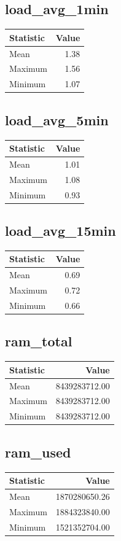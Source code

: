 \documentclass[11pt]{article}
\begin{document}
\subsection{load_avg_1min}
\begin{tabular}{lr}
\toprule
Statistic & Value \\
\midrule
Mean & 1.38 \\
Maximum & 1.56 \\
Minimum & 1.07 \\
\bottomrule
\end{tabular}


\subsection{load_avg_5min}
\begin{tabular}{lr}
\toprule
Statistic & Value \\
\midrule
Mean & 1.01 \\
Maximum & 1.08 \\
Minimum & 0.93 \\
\bottomrule
\end{tabular}


\subsection{load_avg_15min}
\begin{tabular}{lr}
\toprule
Statistic & Value \\
\midrule
Mean & 0.69 \\
Maximum & 0.72 \\
Minimum & 0.66 \\
\bottomrule
\end{tabular}


\subsection{ram_total}
\begin{tabular}{lr}
\toprule
Statistic & Value \\
\midrule
Mean & 8439283712.00 \\
Maximum & 8439283712.00 \\
Minimum & 8439283712.00 \\
\bottomrule
\end{tabular}


\subsection{ram_used}
\begin{tabular}{lr}
\toprule
Statistic & Value \\
\midrule
Mean & 1870280650.26 \\
Maximum & 1884323840.00 \\
Minimum & 1521352704.00 \\
\bottomrule
\end{tabular}
\end{document}
